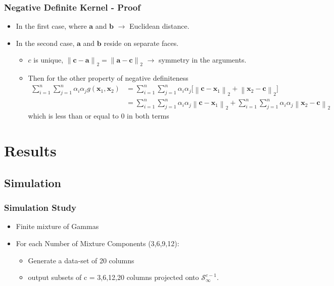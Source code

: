 \documentclass[aspectratio=169]{beamer}
\newcommand{\norm}[1]{\left\lVert #1 \right\rVert}
\newcommand{\pnorm}[2]{\norm{#1}_{#2}}
\begin{document}
\begin{frame}
    \frametitle{Negative Definite Kernel - Proof}
    \begin{itemize}
        \item In the first case, where $\bm{a}$ and $\bm{b}$ $\rightarrow$ Euclidean distance. 
        \item In the second case, $\bm{a}$ and $\bm{b}$ reside on separate
  faces.  
  \begin{itemize}
      \item $c$ is unique, $\pnorm{\bm{c} - \bm{a}}{2} = \pnorm{\bm{a} - \bm{c}}{2}$ $\rightarrow$ symmetry in the arguments.
      \item Then for the other property of negative definiteness
  \begin{equation*}
    \begin{aligned}
      \sum_{i = 1}^n\sum_{j = 1}^n \alpha_i\alpha_j g(\bm{x}_1,\bm{x}_2) &= \sum_{i = 1}^n\sum_{j = 1}^n \alpha_i\alpha_j \bigg[\pnorm{\bm{c} - \bm{x}_1}{2} + \pnorm{\bm{x}_2 - \bm{c}}{2}\bigg]\\
      &= \sum_{i = 1}^n\sum_{j = 1}^n \alpha_i\alpha_j\pnorm{\bm{c} - \bm{x}_1}{2} + \sum_{i = 1}^n\sum_{j = 1}^n \alpha_i\alpha_j\pnorm{\bm{x}_2 - \bm{c}}{2}
    \end{aligned}
  \end{equation*}
  which is less than or equal to $0$ in both terms
  \end{itemize} 
  \end{itemize}
\end{frame}

\section{Results}

\subsection{Simulation}

\begin{frame}
  \frametitle{Simulation Study}
  \begin{itemize}
    \item Finite mixture of Gammas
    \item For each Number of Mixture Components (3,6,9,12):
      \begin{itemize}
        \item Generate a data-set of 20 columns
        \item output subsets of c = 3,6,12,20 columns projected onto $\mathcal{S}_{\infty}^{c-1}$.
      \end{itemize}
  \end{itemize}
\end{frame}
\end{document}
